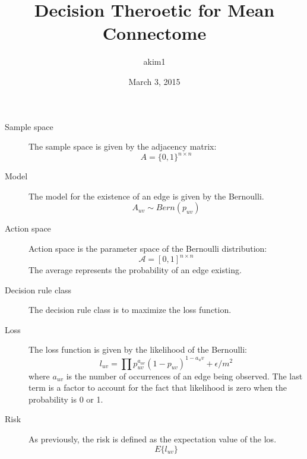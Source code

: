 \documentclass{article}
\title{Decision Theroetic for Mean Connectome}
\author{akim1}
\date{March 3, 2015}
\begin{document}
\maketitle

\begin{description}
\item[Sample space]
The sample space is given by the adjacency matrix:
\begin{equation*}
A=\{0,1\}^{n\times n}
\end{equation*}

\item[Model]
The model for the existence of an edge is given by the Bernoulli.
\begin{equation*}
A_{uv}\sim\mathit{Bern}(p_{uv})
\end{equation*}

\item[Action space]
Action space is the parameter space of the Bernoulli distribution:
\begin{equation*}
\mathscr{A}=[0,1]^{n\times n}
\end{equation*}
The average represents the probability of an edge existing.

\item[Decision rule class]
The decision rule class is to maximize the loss function.

\item[Loss]
The loss function is given by the likelihood of the Bernoulli:
\begin{equation*}
l_{uv}=\prod p_{uv}^{a_{uv}}(1-p_{uv})^{1-a_uv}+\epsilon/m^2
\end{equation*}
where $a_{uv}$ is the number of occurrences of an edge being observed. The last
term is a factor to account for the fact that likelihood is zero when the
probability is 0 or 1.

\item[Risk]
As previously, the risk is defined as the expectation value of the los.
\begin{equation*}
E\{l_{uv}\}
\end{equation*}
\end{description}
\end{document}
